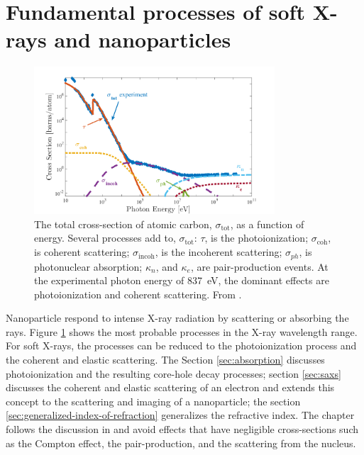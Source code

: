 \section{Fundamental processes of soft X-rays and nanoparticles}\label{sec:light-matter-interaction}
\begin{figure}
	\centering
		\includegraphics[width=0.80\textwidth]{images/absorption-cross-section-carbon-ken.jpg}
	\caption[Total cross-section of atomic carbon.]{The total cross-section of atomic carbon, $\sigma_{\text{tot}}$, as a function of energy. Several processes add to, $\sigma_{\text{tot}}$: $\tau$, is the photoionization; $\sigma_{\text{coh}}$, is coherent scattering; $\sigma_{\text{incoh}}$, is the incoherent scattering; $\sigma_{ph}$, is photonuclear absorption; $\kappa_{n}$, and $\kappa_{e}$, are pair-production events. At the experimental photon energy of \SI{837}{\electronvolt}, the dominant effects are photoionization and coherent scattering. From \citep{Ferguson-2016-PhD,Williams-2009-xb}.}
	\label{fig:absorption-cross-section-carbon-ken}
\end{figure}
%
Nanoparticle respond to intense X-ray radiation by scattering or absorbing the rays. Figure \ref{fig:absorption-cross-section-carbon-ken} shows the most probable processes in the X-ray wavelength range. For soft X-rays, the processes can be reduced to the photoionization process and the coherent and elastic scattering. The Section \ref{sec:absorption} discusses photoionization and the resulting core-hole decay processes; section \ref{sec:saxs} discusses the coherent and elastic scattering of an electron and extends this concept to the scattering and imaging of a nanoparticle; the section \ref{sec:generalized-index-of-refraction} generalizes the refractive index. The chapter follows the discussion in \citep{Als-Nielson-2011-JWS} and avoid effects that have negligible cross-sections such as the Compton effect, the pair-production, and the scattering from the nucleus.
